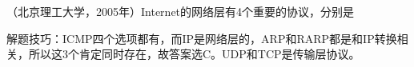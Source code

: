 \question （北京理工大学，2005年）Internet的网络层有4个重要的协议，分别是
\par{}
\begin{solution}解题技巧：ICMP四个选项都有，而IP是网络层的，ARP和RARP都是和IP转换相关，所以这3个肯定同时存在，故答案选C。UDP和TCP是传输层协议。
\end{solution}
